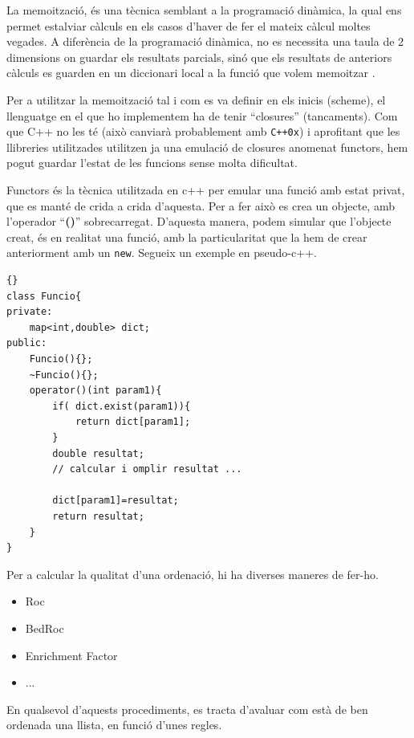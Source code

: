 La memoització, és una tècnica semblant a la programació dinàmica, la qual ens
permet estalviar càlculs en els casos d'haver de fer el mateix càlcul moltes
vegades.  A diferència de la programació dinàmica, no es necessita una taula de
2 dimensions on guardar els resultats parcials, sinó que els resultats de
anteriors càlculs es guarden en un diccionari local a la funció que volem
memoitzar \cite{MJD05}. 

Per a utilitzar la memoització tal i com es va definir en els inicis
(scheme), el llenguatge en el que ho implementem ha de tenir ``closures''
(tancaments).  Com que C++ no les té (això canviarà probablement amb
\texttt{C++0x})
i aprofitant que les llibreries utilitzades utilitzen ja una emulació de
closures anomenat functors, hem pogut guardar l'estat de les funcions sense
molta dificultat. 

Functors és la tècnica utilitzada en c++ per emular una funció amb estat privat,
que es manté de crida a crida d'aquesta.  Per a fer això es crea un objecte, amb
l'operador ``\textbf{()}'' sobrecarregat.  D'aquesta manera, podem simular que l'objecte
creat, és en realitat una funció, amb la particularitat que la hem de crear
anteriorment amb un \texttt{new}.  Segueix un exemple en pseudo-c++.


\lstset{language=c++,
	tabsize=2}
\lstset{commentstyle=\textit}

\begin{lstlisting}[frame=trbl]{}
class Funcio{
private:
	map<int,double> dict;
public:
	Funcio(){};
	~Funcio(){};
	operator()(int param1){
		if( dict.exist(param1)){
			return dict[param1];
		}
		double resultat;
		// calcular i omplir resultat ...

		dict[param1]=resultat;
		return resultat;
	}
}
\end{lstlisting}


Per a calcular la qualitat d'una ordenació, hi ha diverses maneres de fer-ho.

\begin{itemize}
	\item Roc
	\item BedRoc
	\item Enrichment Factor
	\item ...
\end{itemize}


En qualsevol d'aquests procediments, es tracta d'avaluar com està de ben ordenada una llista, en funció d'unes regles.

